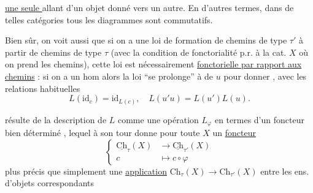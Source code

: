 
\uline{une seule } allant d'un objet donné vers un autre. En d'autres termes, dans de telles catégories tous les diagrammes sont commutatifs.

Bien sûr, on voit aussi que si on a une loi de formation  de chemins de type $\tau'$ à partir de chemins de type $\tau$ (avec la condition de fonctorialité p.r. à la cat. $X$ où on prend les chemins), cette loi est nécessairement \uline{fonctorielle par rapport aux chemins} : si on  a un hom
alors la loi  ``se prolonge'' à de  $u$ pour donner
,
avec les relations habituelles
\[ L(\mathrm{id}_c)=\mathrm{id}_{L(c)},\quad L(u'u)=L(u')L(u). \]

 résulte de la description de $L$ comme une opération $L_\varphi$ en termes d'un foncteur bien déterminé
,
lequel à son tour donne pour toute $X$ un \uline{foncteur}
\[ \left\{\begin{aligned}
\underline{\mathrm{Ch}}_\tau(X)&\longrightarrow\underline{\mathrm{Ch}}_{\tau'}(X)\\
c&\longmapsto c\circ\varphi
\end{aligned}\right. \]
plus précis que simplement une \uline{application} $\mathrm{Ch}_\tau(X)\longrightarrow\mathrm{Ch}_{\tau'}(X)$ entre les ens. d'objets correspondants
